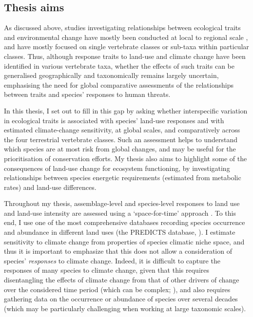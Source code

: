 \subsection{Thesis aims}

As discussed above, studies investigating relationships between ecological traits and environmental change have mostly been conducted at local to regional scale \citep{Hevia2017, Davison2021}, and have mostly focused on single vertebrate classes or sub-taxa within particular classes. Thus, although response traits to land-use and climate change have been identified in various vertebrate taxa, whether the effects of such traits can be generalised geographically and taxonomically remains largely uncertain, emphasising the need for global comparative assessments of the relationships between traits and species' responses to human threats. 
 
In this thesis, I set out to fill in this gap by asking whether interspecific variation in ecological traits is associated with species' land-use responses and with estimated climate-change sensitivity, at global scales, and comparatively across the four terrestrial vertebrate classes. Such an assessment helps to understand which species are at most risk from global changes, and may be useful for the prioritisation of conservation efforts. My thesis also aims to highlight some of the consequences of land-use change for ecosystem functioning, by investigating relationships between species energetic requirements (estimated from metabolic rates) and land-use differences.

Throughout my thesis, assemblage-level and species-level responses to land use and land-use intensity are assessed using a `space-for-time' approach \citep{DePalma2018}. To this end, I use one of the most comprehensive databases recording species occurrence and abundance in different land uses (the PREDICTS database, \citet{Hudson2014, Hudson2017}). I estimate sensitivity to climate change from properties of species climatic niche space, and thus it is important to emphasize that this does not allow a consideration of species' \textit{responses} to climate change. Indeed, it is difficult to capture the responses of many species to climate change, given that this requires disentangling the effects of climate change from that of other drivers of change over the considered time period (which can be complex; \citet{MacLean2017}), and also requires gathering data on the occurrence or abundance of species over several decades (which may be particularly challenging when working at large taxonomic scales). 


